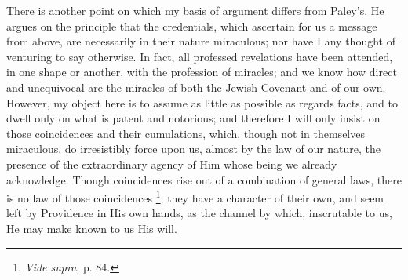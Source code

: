 There is another point on which my basis of argument differs from
Paley's. He argues on the principle that the credentials, which
ascertain for us a message from above, are necessarily in their nature
miraculous; nor have I any thought of venturing to say otherwise. In
fact, all professed revelations have been attended, in one shape or
another, with the profession of miracles; and we know how direct and
unequivocal are the miracles of both the Jewish Covenant and of our
own. However, my object here is to assume as little as possible as
regards facts, and to dwell only on what is patent and notorious; and
therefore I will only insist on those coincidences and their
cumulations, which, though not in themselves miraculous, do
irresistibly force upon us, almost by the law of our nature, the
presence of the extraordinary agency of Him whose being we already
acknowledge. Though coincidences rise out of a combination of general
laws, there is no law of those coincidences \footnote{\emph{Vide supra},
p. 84.}; they have a character of their own, and seem left by
Providence in His own hands, as the channel by which, inscrutable to
us, He may make known to us His will.

